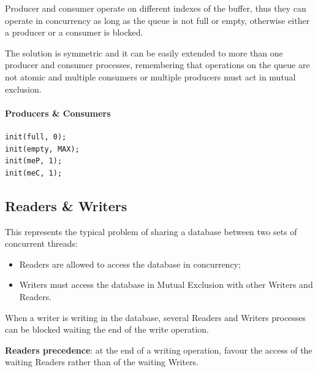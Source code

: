 Producer and consumer operate on different indexes of the buffer, thus they can operate in concurrency as long as the queue is not full or empty, otherwise either a producer or a consumer is blocked.

The solution is symmetric and it can be easily extended to more than one producer and consumer processes, remembering that operations on the queue are not atomic and multiple consumers or multiple producers must act in mutual exclusion.

\paragraph{Producers \& Consumers}
\begin{verbatim}
init(full, 0);
init(empty, MAX);
init(meP, 1);
init(meC, 1);
\end{verbatim}

\begin{Parallel}{}{}
\end{Parallel}

\newpage

\subsection{Readers \& Writers}
This represents the typical problem of sharing a database between two sets of concurrent threads:
\begin{itemize}
\item Readers are allowed to access the database in concurrency;
\item Writers must access the database in Mutual Exclusion with other Writers and Readers.
\end{itemize}
When a writer is writing in the database, several Readers and Writers processes can be blocked waiting the end of the write operation.

\textbf{Readers precedence}: at the end of a writing operation, favour the access of the waiting Readers rather than of the waiting Writers.

